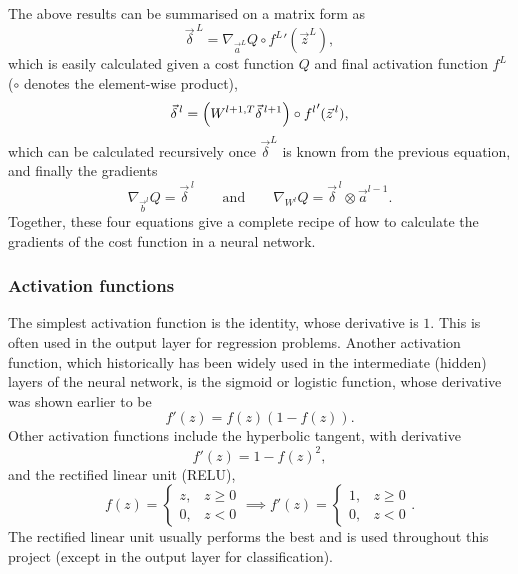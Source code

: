 \documentclass[11pt,british,a4paper]{article}
\numberwithin{equation}{section}
\begin{document}
The above results can be summarised on a matrix form as
\begin{equation}
    \vec{\delta}^{\,L} = \nabla_{\vec{a}^L}Q \circ {f^L}'(\vec{z}^L),
\end{equation}
which is easily calculated given a cost function \(Q\) and final activation function \(f^L\) (\(\circ\) denotes the element-wise product),
\begin{equation}
    \vec{\delta}^{\,l} = \qty(W^{l+1, T}\vec{\delta}^{\,l+1})\circ {f^l}'(\vec{z}^{\,l}),
\end{equation}
which can be calculated recursively once \(\vec{\delta}^L\) is known from the previous equation, and finally the gradients
\begin{equation}
    \nabla_{\vec{b}^l}Q = \vec{\delta}^{\,l} \qquad \text{and}\qquad \nabla_{W^l}Q = \vec{\delta}^{\,l} \otimes \vec{a}^{l-1}.
\end{equation}
Together, these four equations give a complete recipe of how to calculate the gradients of the cost function in a neural network.

\subsubsection{Activation functions}
The simplest activation function is the identity, whose derivative is \(1\). This is often used in the output layer for regression problems.
Another activation function, which historically has been widely used in the intermediate (hidden) layers of the neural network, is the sigmoid or logistic function, whose derivative was shown earlier to be
\begin{equation}
    f'(z) = f(z)(1-f(z)).
\end{equation}
Other activation functions include the hyperbolic tangent, with derivative
\begin{equation}
    f'(z) = 1 - f(z)^2,
\end{equation}
and the rectified linear unit (RELU),
\begin{equation}
    f(z) = \begin{cases}z, & z \geq 0 \\ 0, & z < 0 \end{cases}
    \implies
    f'(z) = \begin{cases}1, & z \geq 0 \\ 0, & z < 0 \end{cases}.
\end{equation}
The rectified linear unit usually performs the best\cite{mehta} and is used throughout this project (except in the output layer for classification).
\end{document}
